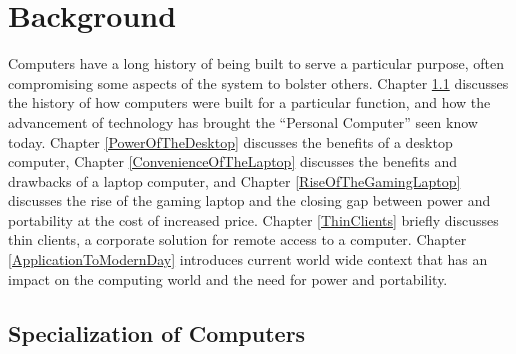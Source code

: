 \chapter{Background} %

\label{Chapter2} %

Computers have a long history of being built to serve a particular purpose, often compromising some aspects of the system to bolster others.
Chapter \ref{SpecializationOfComputers} discusses the history of how computers were built for a particular function, and how the advancement of technology has brought the \enquote{Personal Computer} seen know today.
Chapter \ref{PowerOfTheDesktop} discusses the benefits of a desktop computer, Chapter \ref{ConvenienceOfTheLaptop} discusses the benefits and drawbacks of a laptop computer, and Chapter \ref{RiseOfTheGamingLaptop} discusses the rise of the gaming laptop and the closing gap between power and portability at the cost of increased price.
Chapter \ref{ThinClients} briefly discusses thin clients, a corporate solution for remote access to a computer.
Chapter \ref{ApplicationToModernDay} introduces current world wide context that has an impact on the computing world and the need for power and portability.

\section{Specialization of Computers}\label{SpecializationOfComputers}

